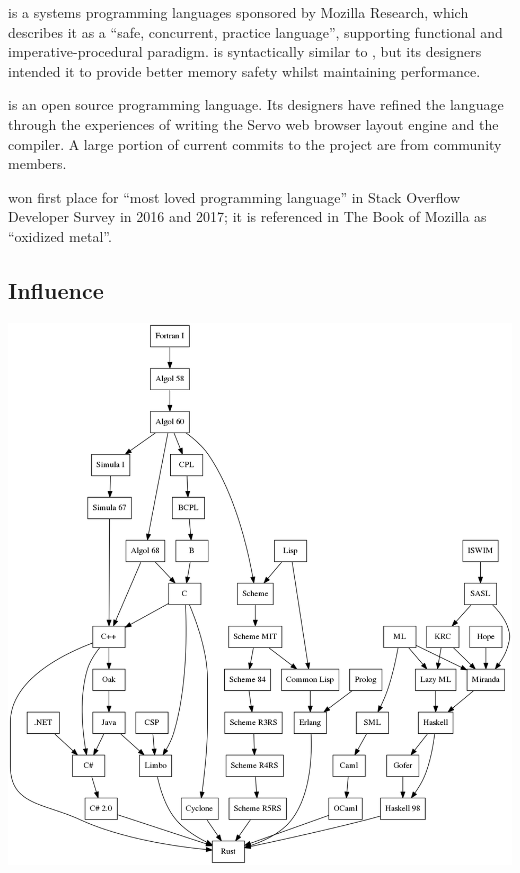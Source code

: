 \documentclass[../Languages.tex]{subfiles}
\begin{document}
\label{sec:rust}

 is a systems programming languages sponsored by Mozilla Research,
which describes it as a ``safe, concurrent, practice language'', supporting
functional and imperative-procedural paradigm.  is syntactically
similar to , but its designers intended it to provide better memory
safety whilst maintaining performance.

 is an open source programming language. Its designers have refined
the language through the experiences of writing the Servo web browser layout
engine and the  compiler. A large portion of current commits to the
project are from community members.

 won first place for ``most loved programming language'' in Stack
Overflow Developer Survey in 2016 and 2017; it is referenced in The Book of
Mozilla as ``oxidized metal''.

\subsection{Influence}\label{sub:influence}

\begin{Figure}
  \centering
  \includegraphics[height=0.5\textheight]{rust}
\end{Figure}

\newpage
\end{document}
